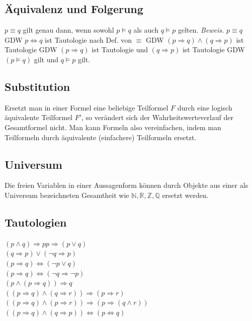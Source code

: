 \subsection*{Äquivalenz und Folgerung}
$p\equiv q$ gilt genau dann, wenn sowohl $p\models q$ als auch $q\models p$ gelten. \emph{Beweis.}
$p\equiv q$ GDW $p\Leftrightarrow q$ ist Tautologie nach Def. von $\equiv$
GDW $(p\Rightarrow q) \wedge (q\Rightarrow p)$ ist Tautologie
GDW $(p\Rightarrow q)$ ist Tautologie und $(q\Rightarrow p)$ ist Tautologie
GDW $(p\models q)$ gilt und $q\models p$ gilt.
\subsection*{Substitution}
Ersetzt man in einer Formel eine beliebige Teilformel $F$ durch eine logisch äquivalente
Teilformel $F'$, so verändert sich der Wahrheitswerteverlauf der Gesamtformel nicht.
Man kann Formeln also vereinfachen, indem man Teilformeln durch äquivalente
(einfachere) Teilformeln ersetzt.
\subsection*{Universum}
Die freien Variablen in einer Aussagenform können durch Objekte aus einer als
Universum bezeichneten Gesamtheit wie $\mathbb{N},\mathbb{R},\mathbb{Z},\mathbb{Q}$ ersetzt werden.
\subsection*{Tautologien}
$(p\wedge q)\Rightarrow p$$p\Rightarrow (p\vee q)$\\
$(q\Rightarrow p)\vee (\neg q\Rightarrow p)$\\
$(p\Rightarrow q)\Leftrightarrow (\neg p\vee q)$\\
$(p\Rightarrow q)\Leftrightarrow (\neg q\Rightarrow\neg p)$ \hfill{}\\
$(p\wedge (p\Rightarrow q))\Rightarrow q$ \hfill{}\\
$((p\Rightarrow q)\wedge (q\Rightarrow r))\Rightarrow (p\Rightarrow r)$\\
$((p\Rightarrow q)\wedge (p\Rightarrow r))\Rightarrow (p\Rightarrow (q\wedge r))$\\
$((p\Rightarrow q)\wedge (q\Rightarrow p))\Leftrightarrow (p\Leftrightarrow q)$
